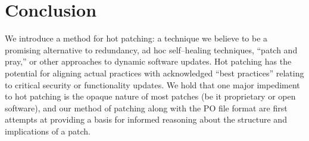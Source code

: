 \section{Conclusion}
\label{sec:conclusion}

We introduce a method for hot patching: a technique we believe to be a
promising alternative to redundancy, ad hoc self--healing techniques,
``patch and pray,'' or other approaches to dynamic software updates.
Hot patching has the potential for aligning actual practices with
acknowledged ``best practices'' relating to critical security or 
functionality updates.  We hold that one major impediment to hot
patching is the opaque nature of most patches (be it
proprietary or open software), and our method of patching along with the
PO file format are first attempts at providing a basis for informed reasoning
about the structure and implications of a patch. 

